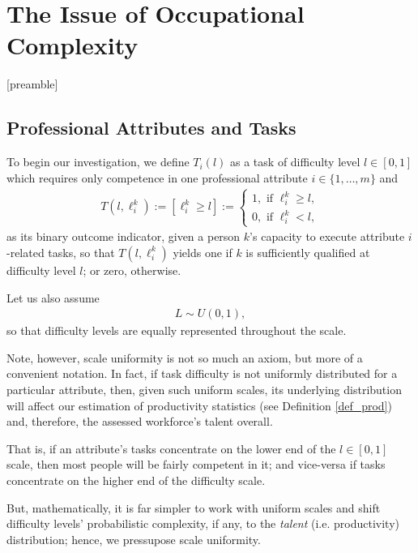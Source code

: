 \documentclass[hidelinks, nonatbib]{elsarticle}
\begin{document}

\newpage
\section{The Issue of Occupational Complexity}
[preamble]

\subsection{Professional Attributes and Tasks}
\begin{definition}
    \label{def_task}
    To begin our investigation, we define $T_i(l)$ as a task of difficulty level $l \in [0,1]$ which requires only competence in one professional attribute $i \in \{1, \dots, m\}$ and
    \begin{gather}
        T(l,\ell_{i}^{k})
        :=
        [\ell_{i}^{k} \geq l]
        :=
        \begin{cases}
            1, \text{ if } \ell_{i}^{k} \geq l,
            \\
            0, \text{ if } \ell_{i}^{k} < l,
        \end{cases}
    \end{gather}
    as its binary outcome indicator, given a person $k$'s capacity to execute attribute $i$-related tasks, so that $T(l,\ell_{i}^{k})$ yields one if $k$ is sufficiently qualified at difficulty level $l$; or zero, otherwise.
\end{definition}
\begin{axiom}
    \label{sua}
    Let us also assume
    \begin{gather}
        L \sim U(0,1)
        ,
    \end{gather}
    so that difficulty levels are equally represented throughout the scale.
    
    Note, however, scale uniformity is not so much an axiom, but more of a convenient notation. In fact, if task difficulty is not uniformly distributed for a particular attribute, then, given such uniform scales, its underlying distribution will affect our estimation of productivity statistics (see Definition \ref{def_prod}) and, therefore, the assessed workforce's talent overall.
    
    That is, if an attribute's tasks concentrate on the lower end of the $l \in [0,1]$ scale, then most people will be fairly competent in it; and vice-versa if tasks concentrate on the higher end of the difficulty scale.
    
    But, mathematically, it is far simpler to work with uniform scales and shift difficulty levels' probabilistic complexity, if any, to the \textit{talent} (i.e. productivity) distribution; hence, we pressupose scale uniformity.
\end{axiom}
\end{document}
